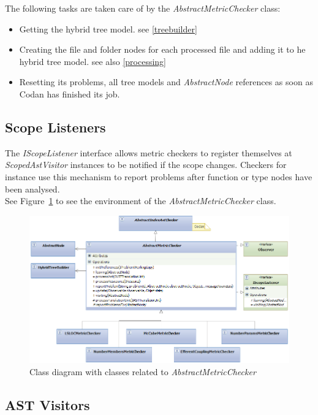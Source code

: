 \documentclass[11pt,a4paper,oneside]{scrreprt}
\begin{document}
The following tasks are taken care of by the \textit{AbstractMetricChecker} class:
\begin{itemize}
\item Getting the hybrid tree model. see \ref{treebuilder}
\item Creating the file and folder nodes for each processed file and adding it to he hybrid tree model. see also \ref{processing}
\item Resetting its problems, all tree models and \textit{AbstractNode} references as soon as Codan has finished its job.
\end{itemize}

\subsection{Scope Listeners}\label{scopelisteners}
The \textit{IScopeListener} interface allows metric checkers to register themselves at \textit{ScopedAstVisitor} instances to be notified if the scope changes. Checkers for instance use this mechanism to report problems after function or type nodes have been analysed.\\
See Figure~\ref{fig:checkers} to see the environment of the \textit{AbstractMetricChecker} class.

\begin{figure}[th]
\begin{center}
\includegraphics[width=\textwidth]{figures/checkers.png}
\end{center}
\caption{Class diagram with classes related to \textit{AbstractMetricChecker}}
\label{fig:checkers}
\end{figure}

\subsection{AST Visitors}\label{ast_visitors}
\end{document}
